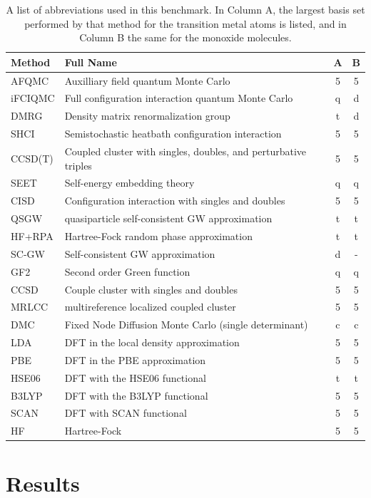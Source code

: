  \begin{table}
 \caption{A list of abbreviations used in this benchmark.
 In Column A, the largest basis set performed by that method for the transition metal atoms is listed, and in Column B the same for the monoxide
 molecules. }\label{table:abbreviations}
 \begin{tabular} {l|p{}|c|c}
 Method & Full Name & A & B \\
 \hline
 AFQMC & Auxilliary field quantum Monte Carlo & 5 & 5\\
 iFCIQMC & Full configuration interaction quantum Monte Carlo & q & d\\
 DMRG & Density matrix renormalization group & t & d \\
 SHCI & Semistochastic heatbath configuration interaction & 5 &5 \\
 CCSD(T) & Coupled cluster with singles, doubles, and perturbative triples & 5 & 5 \\
 SEET & Self-energy embedding theory & q & q \\
 CISD & Configuration interaction with singles and doubles & 5 & 5 \\
 QSGW & quasiparticle self-consistent GW approximation & t & t \\
 HF+RPA & Hartree-Fock random phase approximation &t & t \\
 SC-GW & Self-consistent GW approximation & d & - \\
 GF2 & Second order Green function & q & q \\
 CCSD & Couple cluster with singles and doubles & 5 &5 \\
 MRLCC & multireference localized coupled cluster &5 & 5\\
 DMC & Fixed Node Diffusion Monte Carlo (single determinant) & c & c\\
 LDA & DFT in the local density approximation & 5 & 5\\
 PBE & DFT in the PBE approximation &5 & 5  \\
 HSE06 & DFT with the HSE06 functional &t & t\\
 B3LYP & DFT with the B3LYP functional &5 & 5\\
 SCAN & DFT with SCAN functional & 5 & 5\\
 HF & Hartree-Fock & 5 & 5\\
     \end{tabular}
 \end{table}


\section{Results}

